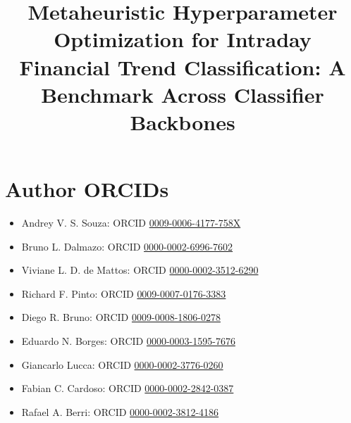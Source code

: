 \documentclass[sn-mathphys-num,Numbered]{sn-jnl}
\begin{document}
\title[Metaheuristic optimization for intraday trend classification]{%
  Metaheuristic Hyperparameter Optimization for Intraday Financial Trend
  Classification: A Benchmark Across Classifier Backbones}

\author[1]{ }
\author*[1]{ }
\author[1]{ }
\author[1]{ }
\author[2]{ }
\author[1]{ }
\author[1,3]{ }
\author[3]{ }
\author[1]{ }




\maketitle

\section*{Author ORCIDs}
\begin{itemize}
    \item Andrey V. S. Souza: ORCID \href{https://orcid.org/0009-0006-4177-758X}{0009-0006-4177-758X}
    \item Bruno L. Dalmazo: ORCID \href{https://orcid.org/0000-0002-6996-7602}{0000-0002-6996-7602}
    \item Viviane L. D. de Mattos: ORCID \href{https://orcid.org/0000-0002-3512-6290}{0000-0002-3512-6290}
    \item Richard F. Pinto: ORCID \href{https://orcid.org/0009-0007-0176-3383}{0009-0007-0176-3383}
    \item Diego R. Bruno: ORCID \href{https://orcid.org/0009-0008-1806-0278}{0009-0008-1806-0278}
    \item Eduardo N. Borges: ORCID \href{https://orcid.org/0000-0003-1595-7676}{0000-0003-1595-7676}
    \item Giancarlo Lucca: ORCID \href{https://orcid.org/0000-0002-3776-0260}{0000-0002-3776-0260}
    \item Fabian C. Cardoso: ORCID \href{https://orcid.org/0000-0002-2842-0387}{0000-0002-2842-0387}
    \item Rafael A. Berri: ORCID \href{https://orcid.org/0000-0002-3812-4186}{0000-0002-3812-4186}
\end{itemize}
\end{document}
